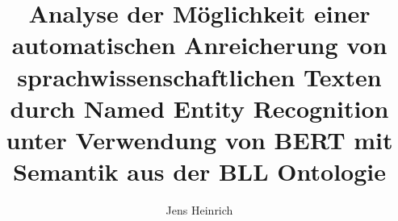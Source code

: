 
\title{Analyse der Möglichkeit einer automatischen Anreicherung von sprachwissenschaftlichen Texten durch Named Entity Recognition unter Verwendung von BERT mit Semantik aus der BLL Ontologie}


\author{Jens Heinrich}

